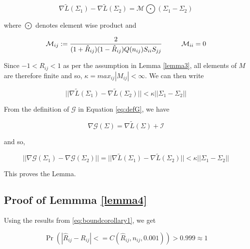\begin{equation}\label{eq:Ltildebound}
    \nabla \tilde{L} (\Sigma_1) - \nabla \tilde{L} (\Sigma_2) = \mathcal{M} \bigodot (\Sigma_1 - \Sigma_2) 
\end{equation}

where $\bigodot$ denotes element wise product and 

\begin{equation}\label{eq:Mdef}
    \mathcal{M}_{ij} := \frac{2}{(1+\hat{R}_{ij})(1-\hat{R}_{ij})Q(n_{ij})S_{ii}S_{jj}} \hspace{1 cm} \mathcal{M}_{ii} = 0
\end{equation}

Since $-1 < R_{ij} < 1$ as per the assumption in Lemma \ref{lemma3}, all elements of $M$ are therefore finite and so, $\kappa = max_{ij} |M_{ij}| < \infty $. We can then write

\begin{equation}\label{eq:lipschitzL}
||  \nabla \tilde{L} (\Sigma_1) - \nabla \tilde{L} (\Sigma_2) || < \kappa || \Sigma_1 - \Sigma_2 || 
\end{equation}

From the definition of $\mathcal{G}$ in Equation \ref{eq:defG}, we have

\begin{equation}\label{eq:GtoL}
    \nabla \mathcal{G} (\Sigma) = \nabla \tilde{L} (\Sigma) + \mathcal{I}
\end{equation}

and so, 

\begin{equation}
    ||  \nabla \mathcal{G} (\Sigma_1) - \nabla \mathcal{G} (\Sigma_2) || = ||  \nabla \tilde{L} (\Sigma_1) - \nabla \tilde{L} (\Sigma_2) || < \kappa || \Sigma_1 - \Sigma_2 ||
\end{equation}

This proves the Lemma. 


\subsection{Proof of Lemmma \ref{lemma4}}

Using the results from \ref{eq:boundcorollary1}, we get

\begin{equation}\label{eq:bound1}
\Pr \left ( |\hat{R}_{ij} - R_{ij}| <=  C( \hat{R}_{ij}, n_{ij}, 0.001 ) \right) > 0.999 \approx 1
\end{equation}


